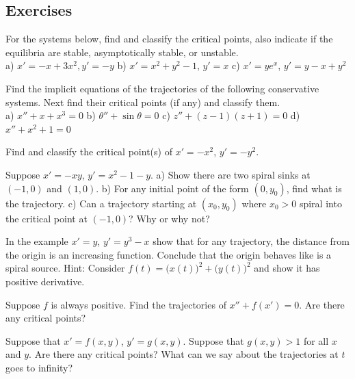 \subsection{Exercises}

\begin{exercise}
For the systems below, find and classify the critical points, also indicate
if the equilibria are stable, asymptotically stable, or unstable.\\
a) $x'=-x+3x^2, y'=-y$ \qquad
b) $x'=x^2+y^2-1$, $y'=x$ \qquad
c) $x'=ye^x$, $y'=y-x+y^2$
\end{exercise}

\begin{exercise}
Find the implicit equations of the trajectories of the following
conservative systems.  Next find their critical points (if any) and classify them.
\\
a) $x''+ x+x^3 = 0$
\qquad
b) $\theta''+\sin \theta = 0$
\qquad
c) $z''+ (z-1)(z+1) = 0$
\qquad
d) $x''+ x^2+1 = 0$
\end{exercise}

\begin{exercise}
Find and classify the critical point(s) of $x' = -x^2$, $y' = -y^2$.
\end{exercise}

\begin{exercise}
Suppose $x'=-xy$, $y'=x^2-1-y$.  a) Show there are two spiral sinks at
$(-1,0)$ and $(1,0)$.  b)
For any initial point of the form $(0,y_0)$, find what is the trajectory.
c) Can a trajectory starting at $(x_0,y_0)$ where $x_0 > 0$ spiral into 
the critical point at $(-1,0)$?  Why or why not?
\end{exercise}

\begin{exercise} \label{exercise:increasing}
In the example $x'=y$, $y'=y^3-x$ show that for any trajectory, the distance
from the origin is an increasing function.
Conclude
that the origin behaves like is a spiral source.
Hint: Consider $f(t) =
{\bigl(x(t)\bigr)}^2 + 
{\bigl(y(t)\bigr)}^2$ and show it has positive derivative.
\end{exercise}


\begin{exercise}
Suppose $f$ is always positive.
Find the trajectories of $x''+f(x') = 0$.
Are there any critical points?
\end{exercise}

\begin{exercise}
Suppose that $x' = f(x,y)$, $y' = g(x,y)$.  Suppose that $g(x,y) > 1$ for
all $x$ and $y$.  Are there any critical points?  What can we say about the
trajectories at $t$ goes to infinity?
\end{exercise}

